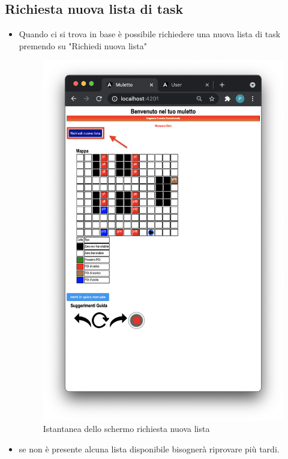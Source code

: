 \subsection{Richiesta nuova lista di task}
\begin{itemize}
    \item Quando ci si trova in base è possibile richiedere una nuova lista di task premendo su "Richiedi nuova lista"
    \begin{figure}[H]
        \centering
        \includegraphics[scale=0.45]{res/images/nuovalista.png}
        \caption{Istantanea dello schermo richiesta nuova lista}
    \end{figure}
    \item se non è presente alcuna lista disponibile bisognerà riprovare più tardi.
    \begin{figure}[H]

\end{figure}
\end{itemize}
